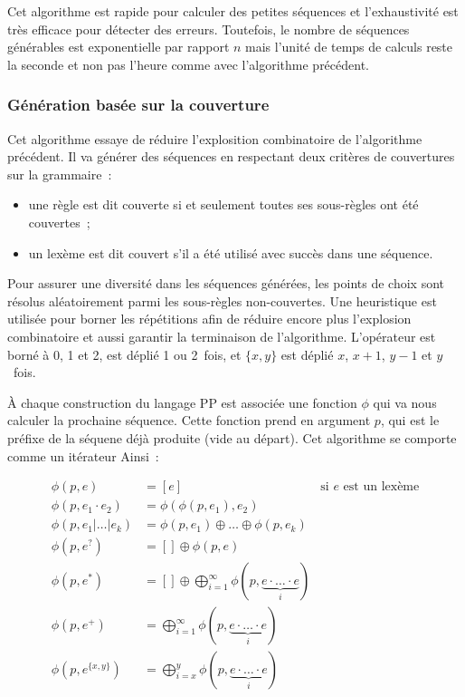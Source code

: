 Cet algorithme est rapide pour calculer des petites séquences et l'exhaustivité
est très efficace pour détecter des erreurs. Toutefois, le nombre de séquences
générables est exponentielle par rapport $n$ mais l'unité de temps de calculs
reste la seconde et non pas l'heure comme avec l'algorithme précédent.

\subsubsection{Génération basée sur la couverture}
\label{subsection:data:coverage_based_generation}

Cet algorithme essaye de réduire l'explosition combinatoire de l'algorithme
précédent. Il va générer des séquences en respectant deux critères de
couvertures sur la grammaire~:
%
\begin{itemize}

\item une règle est dit couverte si et seulement toutes ses sous-règles ont été
couvertes~;

\item un lexème est dit couvert s'il a été utilisé avec succès dans une
séquence.

\end{itemize}
%
Pour assurer une diversité dans les séquences générées, les points de choix sont
résolus aléatoirement parmi les sous-règles non-couvertes. Une heuristique est
utilisée pour borner les répétitions afin de réduire encore plus l'explosion
combinatoire et aussi garantir la terminaison de l'algorithme. L'opérateur
\code{*} est borné à 0, 1 et 2, \code{+} est déplié 1 ou 2~fois, et $\{x, y\}$
est déplié $x$, $x + 1$, $y - 1$ et $y$~fois.

À chaque construction du langage PP est associée une fonction $\phi$ qui va nous
calculer la prochaine séquence. Cette fonction prend en argument $p$, qui est le
préfixe de la séquene déjà produite (vide au départ). Cet algorithme se comporte
comme un itérateur Ainsi~:

\begin{align*}
%
\phi(p, e) & =
    [e]
    &
    \text{si $e$ est un lexème}
    \\
%
\phi(p, e_1 \cdot e_2) & =
    \phi(\phi(p, e_1), e_2)
    \\
%
\phi(p, e_1 \vert \dotso \vert e_k) & =
    \phi(p, e_1) \oplus \dotso \oplus \phi(p, e_k)
    \\
%
\phi(p, e^?) & =
    [] \oplus \phi(p, e)
    \\
%
\phi(p, e^*) & =
    [] \oplus \bigoplus_{i = 1}^\infty
    \phi(p, \underbrace{e \cdot \dotso \cdot e}_i)
    \\
%
\phi(p, e^+) & =
    \bigoplus_{i = 1}^\infty \phi(p, \underbrace{e \cdot \dotso \cdot e}_i)
    \\
%
\phi(p, e^{\{x, y\}}) & =
    \bigoplus_{i = x}^y \phi(p, \underbrace{e \cdot \dotso \cdot e}_i)
%
\end{align*}

